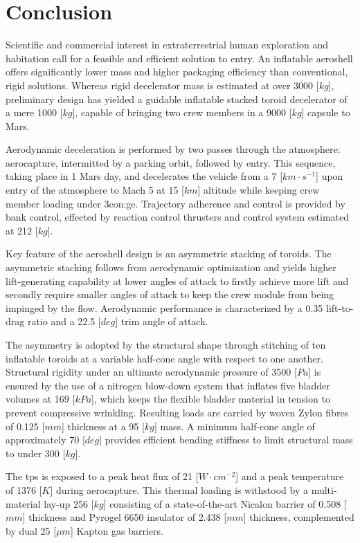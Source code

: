 \section{Conclusion}

Scientific and commercial interest in extraterrestrial human exploration and habitation call for a feasible and efficient solution to entry. An inflatable aeroshell offers significantly lower mass and higher packaging efficiency than conventional, rigid solutions. Whereas rigid decelerator mass is estimated at over 3000 [$kg$], preliminary design has yielded a guidable inflatable stacked toroid decelerator of a mere 1000 [$kg$], capable of bringing two crew members in a 9000 [$kg$] capsule to Mars.

Aerodynamic deceleration is performed by two passes through the atmosphere: aerocapture, intermitted by a parking orbit, followed by entry. This sequence, taking place in 1 Mars day, and decelerates the vehicle from a 7 [$km \cdot s^{-1}$] upon entry of the atmosphere to Mach 5 at 15 [$km$] altitude while keeping crew member loading under 3\gls{con:ge}. Trajectory adherence and control is provided by bank control, effected by reaction control thrusters and control system estimated at 212 [$kg$].

Key feature of the aeroshell design is an asymmetric stacking of toroids. The asymmetric stacking follows from aerodynamic optimization and yields higher lift-generating capability at lower angles of attack to firstly achieve more lift and secondly require smaller angles of attack to keep the crew module from being impinged by the flow. Aerodynamic performance is characterized by a 0.35 lift-to-drag ratio and a 22.5 [$deg$] trim angle of attack.

The asymmetry is adopted by the structural shape through stitching of ten inflatable toroids at a variable half-cone angle with respect to one another. Structural rigidity under an ultimate aerodynamic pressure of 3500 [$Pa$] is ensured by the use of a nitrogen blow-down system that inflates five bladder volumes at 169 [$kPa$], which keeps the flexible bladder material in tension to prevent compressive wrinkling. Resulting loads are carried by woven Zylon fibres of 0.125 [$mm$] thickness at a 95 [$kg$] mass. A minimum half-cone angle of approximately 70 [$deg$] provides efficient bending stiffness to limit structural mass to under 300 [$kg$].

The \acrlong{tps} is exposed to a peak heat flux of 21 [$W \cdot cm^{-2}$] and a peak temperature of 1376 [$K$] during aerocapture. This thermal loading is withstood by a multi-material lay-up 256 [$kg$] consisting of a state-of-the-art Nicalon barrier of 0.508 [$mm$] thickness and Pyrogel 6650 insulator of 2.438 [$mm$] thickness, complemented by dual 25 [$\mu m$] Kapton gas barriers. 

